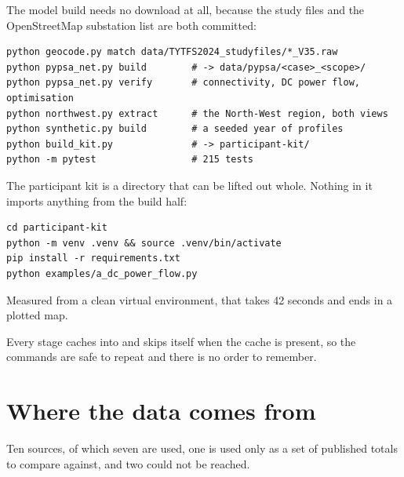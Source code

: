 \documentclass[11pt,a4paper]{article}
\begin{document}
The model build needs no download at all, because the study files and the
OpenStreetMap substation list are both committed:

\begin{lstlisting}[language=shell]
python geocode.py match data/TYTFS2024_studyfiles/*_V35.raw
python pypsa_net.py build        # -> data/pypsa/<case>_<scope>/
python pypsa_net.py verify       # connectivity, DC power flow, optimisation
python northwest.py extract      # the North-West region, both views
python synthetic.py build        # a seeded year of profiles
python build_kit.py              # -> participant-kit/
python -m pytest                 # 215 tests
\end{lstlisting}

The participant kit is a directory that can be lifted out whole. Nothing in it
imports anything from the build half:

\begin{lstlisting}[language=shell]
cd participant-kit
python -m venv .venv && source .venv/bin/activate
pip install -r requirements.txt
python examples/a_dc_power_flow.py
\end{lstlisting}

Measured from a clean virtual environment, that takes 42 seconds and ends in a
plotted map.

Every stage caches into  and skips itself when the cache is
present, so the commands are safe to repeat and there is no order to remember.

\clearpage
\section{Where the data comes from}
\label{sec:sources}

Ten sources, of which seven are used, one is used only as a set of published
totals to compare against, and two could not be reached.
\end{document}
